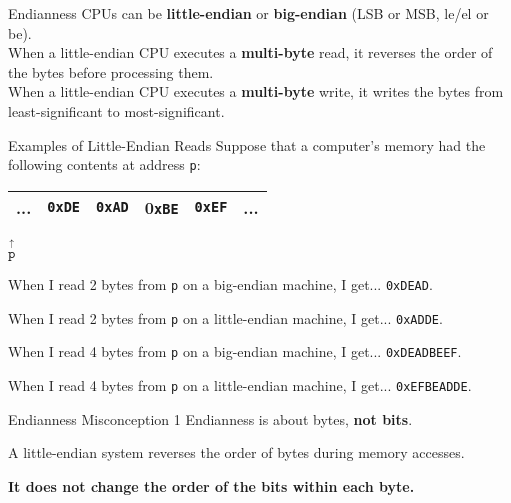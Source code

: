 \documentclass[hyphens,aspectratio=169,dvipsnames]{beamer}
\begin{document}
\begin{frame}{Endianness}
    CPUs can be \textbf{little-endian} or \textbf{big-endian} (LSB or MSB, le/el or be). \\

    When a little-endian CPU executes a \textbf{multi-byte} read, it reverses the order of the bytes before processing them. \\

    When a little-endian CPU executes a \textbf{multi-byte} write, it writes the bytes from least-significant to most-significant.
\end{frame}

\begin{frame}{Examples of Little-Endian Reads}
    Suppose that a computer's memory had the following contents at address \texttt{p}:
    \begin{center}
        \begin{tabular}{c|c|c|c|c|c}
            \hline
            ... & \texttt{0xDE} & \texttt{0xAD} & 0\texttt{xBE} & \texttt{0xEF} & ... \\
            \hline
        \end{tabular}

            $\overset{\uparrow}{\texttt{p}}~~~~~~~~~~~~~~~~~~~~~~~~~~~~~~~~~~~~~~$ \\ %

    \end{center}

    When I read 2 bytes from \texttt{p} on a big-endian machine, I get... \pause \texttt{0xDEAD}.

    When I read 2 bytes from \texttt{p} on a little-endian machine, I get... \pause \texttt{0xADDE}.

    When I read 4 bytes from \texttt{p} on a big-endian machine, I get... \pause \texttt{0xDEADBEEF}.

    When I read 4 bytes from \texttt{p} on a little-endian machine, I get... \pause \texttt{0xEFBEADDE}.
\end{frame}

\begin{frame}{Endianness Misconception 1}
    Endianness is about bytes, \textbf{not bits}.

    A little-endian system reverses the order of bytes during memory accesses.

    \begin{center}\textbf{It does not change the order of the bits within each byte.}\end{center}

\end{frame}
\end{document}
